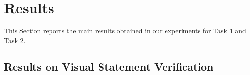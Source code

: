 \section{Results} \label{sec:results}
This Section  reports the main results obtained in our experiments for Task 1 and Task 2.

\subsection{Results on Visual Statement Verification}
\label{ref:vvs} 

\begin{comment}
\begin{table*}
  \centering
  \resizebox{\textwidth}{!}{%

  \renewcommand{\arraystretch}{1.2}
  \setlength{\tabcolsep}{4pt}
  \begin{tabular}{lc|cc|c|cc|c|c|c|c|cc|cc|c}
    \toprule
       Model & \textbf{Avg. Acc}. & \multicolumn{2}{|c|}{\textbf{Causal}} & \textbf{Counterfactual} & \multicolumn{2}{c|}{\textbf{Implicit}} & \textbf{Uncertainty} & \textbf{Out-of-Scope} & \textbf{Planning} & \textbf{Sentiment} & \multicolumn{2}{c}{\textbf{Spatial}} & \multicolumn{2}{|c|}{\textbf{Temporal}} & Correlation w/ Baseline\\
               & &  \textit{Explicit}
  & \textit{Implicit} & & \textit{Partial} & \textit{Total} & & & & &  \textit{Partial} & \textit{Total} & \textit{Duration} & \textit{Partial} & \\ 
            \midrule
            \midrule

    LLMs Ensemble &  0.56  &  0.43    &  0.48   &  0.73  &  0.50  &  0.51  &  0.79  &  0.55  &  0.68  &  0.53  &  0.48  &  0.51  &  0.53  &  0.48 & //  \\
    \midrule
    \midrule
    \textit{InternVL2} &   0.79  &  0.82   &  0.84  &  \textbf{0.85}  &  0.75  &  0.83  &  0.84  &  0.77  &  0.75  &  0.84  &  0.69  &  0.86  &  0.66  & 0.76 & 0.229 \\ 
     \textit{LLava-NeXT-Video} &   0.52\footnotemark[1]   & 0.54  & 0.57  &  0.57 &  0.52 & 0.59 & 0.32 & 0.42 &  0.57 &  0.61 & 0.52 & 0.56 & 0.51 & 0.48 & -0.436 \\ 
     
    \textit{LLava-oneVision} & 0.81  &  0.86 & 0.88 & 0.78 & 0.80 & 0.85 & 0.85 & 0.88 &  0.76 & \textbf{0.88} & 0.71 & 0.87 & 0.65 & 0.80 & -0.068 \\ 
   
    \textit{Qwen-2.5-VL} & \textbf{0.84} & \textbf{0.89} & \textbf{0.90} & 0.80 & \textbf{0.82} & \textbf{0.88} & \textbf{0.92} & \textbf{0.89} & \textbf{0.78} & 0.86 & \textbf{0.73} & \textbf{0.90} & \textbf{0.75} & \textbf{0.81}  & 0.030\\  
    \bottomrule
  \end{tabular}%
  }
  \caption{\label{Table: Result_task1}
    Accuracy performance of 4 VLMs on the MAIA benchmark for Visual Statement Verification (Task 1).
  }
\end{table*}
\footnotetext[1]{For this  model, 193 cases of out-of-domain responses (i.e., neither A nor B) were recorded.}
\end{comment}


